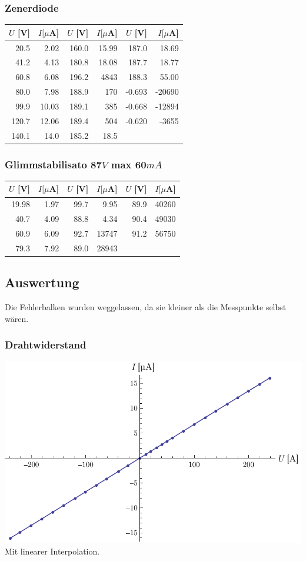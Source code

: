 \documentclass[12pt,a4paper]{article}
\begin{document}
\subsubsection*{Zenerdiode}
\begin{tabular}{|r|r|r|r|r|r|}
\hline
$U$ [V]&$I [\mu $A]&$U$ [V]&$I [\mu $A]&$U$ [V]&$I [\mu $A]\\
\hline
20.5&2.02&160.0&15.99&187.0&18.69\\
41.2&4.13&180.8&18.08&187.7&18.77\\
60.8&6.08&196.2&4843&188.3&55.00\\
80.0&7.98&188.9&170&-0.693&-20690\\
99.9&10.03&189.1&385&-0.668&-12894\\
120.7&12.06&189.4&504&-0.620&-3655\\
140.1&14.0&185.2&18.5&&\\
\hline
\end{tabular}

\subsubsection*{Glimmstabilisato 87$V$ max 60$mA$}
\begin{tabular}{|r|r|r|r|r|r|}
\hline
$U$ [V]&$I [\mu $A]&$U$ [V]&$I [\mu $A]&$U$ [V]&$I [\mu $A]\\
\hline
19.98&1.97&99.7&9.95&89.9&40260\\
40.7&4.09&88.8&4.34&90.4&49030\\
60.9&6.09&92.7&13747&91.2&56750\\
79.3&7.92&89.0&28943&&\\
\hline
\end{tabular}

\subsection*{Auswertung}
Die Fehlerbalken wurden weggelassen, da sie kleiner als die Messpunkte selbst w\"aren.

\subsubsection*{Drahtwiderstand}
\includegraphics[width=14cm]{draht.pdf}
Mit linearer Interpolation.
\end{document}
